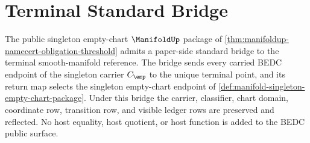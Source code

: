 \section{Terminal Standard Bridge}
\label{sec:manifold-terminal-standard-bridge}

\begin{theorem}
\label{thm:manifoldup-terminal-standard-bridge}
The public singleton empty-chart $\ManifoldUp$ package of
\autoref{thm:manifoldup-namecert-obligation-threshold} admits a paper-side
standard bridge to the terminal smooth-manifold reference. The bridge sends
every carried BEDC endpoint of the singleton carrier $C_{\emp}$ to the unique
terminal point, and its return map selects the singleton empty-chart endpoint
of \autoref{def:manifold-singleton-empty-chart-package}. Under this bridge the
carrier, classifier, chart domain, coordinate row, transition row, and visible
ledger rows are preserved and reflected. No host equality, host quotient, or
host function is added to the BEDC public surface.
\end{theorem}
